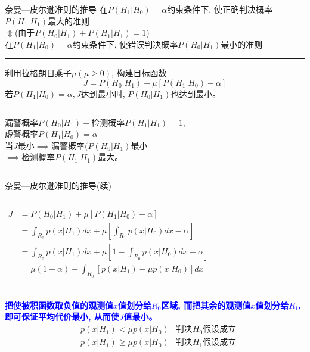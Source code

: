 \begin{frame}[shrink]{奈曼---皮尔逊准则的推导}
在$P(H_1|H_0)=\alpha$约束条件下, 使正确判决概率$P(H_1|H_1)$最大的准则\\
\qquad\qquad\qquad $\Updownarrow$\quad(由于$P(H_0|H_1)+P(H_1|H_1)=1$)\\
在$P(H_1|H_0)=\alpha$约束条件下, 使错误判决概率$P(H_0|H_1)$最小的准则
\rule{\textwidth}{1pt} %
利用拉格朗日乘子$\mu(\mu\ge 0)$, 构建目标函数
\[ J=P(H_0|H_1)+\mu\left[P(H_1|H_0)-\alpha\right]\]
若$P(H_1|H_0)=\alpha, J$达到最小时, $P(H_0|H_1)$也达到最小。
\begin{columns}
\scriptsize
{}
漏警概率$P(H_0|H_1)+$检测概率$P(H_1|H_1)=1$,\\ 虚警概率$P(H_1|H_0)=\alpha$\\
当$J$最小$\implies$漏警概率$(P(H_0|H_1)$最小\\
$\implies$检测概率$P(H_1|H_1)$最大。
\leftline{\texttt{[image: R0R1]}}
\end{columns}
\end{frame}

\begin{frame}[shrink]{奈曼---皮尔逊准则的推导(续)}
\begin{columns}
\begin{align*}
J&=P(H_0|H_1)+\mu[P(H_1|H_0)-\alpha]\\
&=\int_{R_0}p(x|H_1)dx+\mu\left[\int_{R_1}p(x|H_0)dx-\alpha\right]\\
&=\int_{R_0}p(x|H_1)dx+\mu\left[1-\int_{R_0}p(x|H_0)dx-\alpha\right]\\
&=\mu(1-\alpha)+\int_{R_0}\left[p(x|H_1)-\mu p(x|H_0)\right]dx \\
\end{align*}
\leftline{\texttt{[image: R0R1]}}
\end{columns}
\textbf{\textcolor{blue}{把使被积函数取负值的观测值$x$值划分给$R_0$区域, 而把其余的观测值$x$值划分给$R_1$, 即可保证平均代价最小, 从而使$J$值最小。}}
\begin{align*}
&p(x|H_1)< \mu p(x|H_0)&\textbf{判决$H_0$假设成立}\\
&p(x|H_1)\ge \mu p(x|H_0)&\textbf{判决$H_1$假设成立}
\end{align*}
\end{frame}

